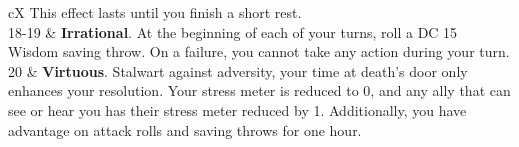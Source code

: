 \begin{table}[t]
\begin{DndTable}[width=\linewidth, header=Affliction]{cX}
        This effect lasts until you finish a short rest. \\
        18-19 & \textbf{Irrational}.
        At the beginning of each of your turns, roll a DC 15 Wisdom saving throw.
        On a failure, you cannot take any action during your turn. \\
        20    & \textbf{Virtuous}.
        Stalwart against adversity, your time at death's door only enhances your resolution.
        Your stress meter is reduced to 0, and any ally that can see or hear you has their stress meter reduced by 1.
        Additionally, you have advantage on attack rolls and saving throws for one hour.
    \end{DndTable}
    \end{table}

    \thispagestyle{empty} %
